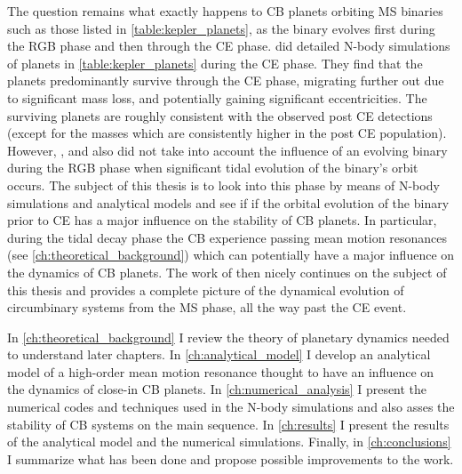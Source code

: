 \documentclass[twoside,openright,titlepage,numbers=noenddot,headinclude,%
                footinclude=true,cleardoublepage=empty,abstractoff, 
                BCOR=5mm,paper=a4,fontsize=11pt,%
                american,%
                ]{scrreprt}%
\begin{document}
The question remains what exactly happens to CB planets orbiting MS binaries
such as those listed in \cref{table:kepler_planets}, as the binary 
evolves first during
the RGB phase and then through the CE phase. \citet{Kostov2016} did detailed
N-body simulations of  planets in \cref{table:kepler_planets} during the 
CE phase. They find that the planets predominantly survive through the
CE phase, migrating further out due to significant mass loss, and potentially
gaining significant eccentricities. The surviving planets are roughly consistent
with the observed post CE detections (except for the masses which are 
consistently higher in the post CE population). However, \citet{Kostov2016},
and also \citet{Mustill2013a} did not take into account the influence of an 
evolving binary during the RGB phase when significant tidal evolution of
the binary's orbit occurs. The subject of this thesis is to look into
this phase by means of N-body simulations and analytical models and see if
if the orbital evolution of the binary prior to CE has a major influence on
the stability of CB planets. In particular, during the tidal decay phase the
CB experience passing mean motion resonances 
(see \cref{ch:theoretical_background}) which can potentially have a major 
influence on the dynamics of CB planets. The work of \citet{Kostov2016} then
nicely continues on the subject of this thesis and provides a complete picture
of the dynamical evolution of circumbinary systems from the MS phase, all
the way past the CE event. 

In \cref{ch:theoretical_background} I review the theory of planetary
dynamics needed to understand later chapters. In \cref{ch:analytical_model}
I develop an analytical model of a high-order mean motion 
resonance thought to have an influence on the dynamics of close-in CB planets.
In \cref{ch:numerical_analysis} I present the numerical codes and techniques
used in the N-body simulations and also asses the stability of CB systems on the
main sequence. In \cref{ch:results} I present the results of the analytical
model and the numerical simulations. Finally, in \cref{ch:conclusions}
I summarize what has been done and propose possible improvements to the work.

\clearpage
\end{document}
